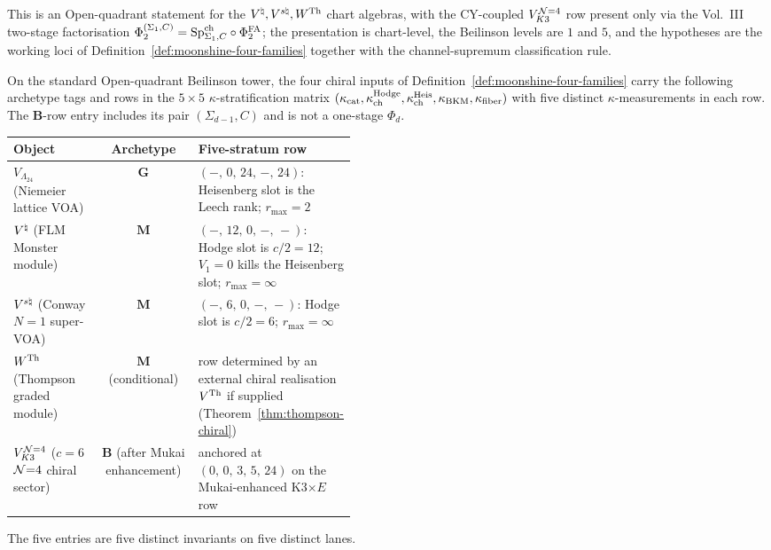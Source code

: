\begin{remark}
\label{rem:moonshine-five-stratum-archetype}
This is an Open-quadrant statement for the $V^{\natural},V^{s\natural},W^{\mathrm{Th}}$
chart algebras, with the CY-coupled $V_{K3}^{\mathcal N{=}4}$ row present only via
the Vol.~III two-stage factorisation
$\Phi_2^{(\Sigma_1,C)}=\mathrm{Sp}^{\mathrm{ch}}_{\Sigma_1,C}\circ\Phi^{\mathrm{FA}}_2$;
the presentation is chart-level, the Beilinson levels are $1$ and
$5$, and the hypotheses are the working loci of
Definition~\ref{def:moonshine-four-families} together with the
channel-supremum classification rule.

On the standard Open-quadrant Beilinson tower, the four chiral inputs
of Definition~\ref{def:moonshine-four-families} carry the following
archetype tags and rows in the
$5\times5$ $\kappa$-stratification matrix
$(\kappa_{\mathrm{cat}},\kappa^{\mathrm{Hodge}}_{\mathrm{ch}},
\kappa^{\mathrm{Heis}}_{\mathrm{ch}},\kappa_{\mathrm{BKM}},\kappa_{\mathrm{fiber}})$
with five distinct $\kappa$-measurements in each row. The
$\mathbf B$-row entry includes its pair $(\Sigma_{d-1},C)$ and is
not a one-stage $\Phi_d$.
\begin{center}
\renewcommand{\arraystretch}{1.3}
\begin{tabular}{l|c|p{0.45\linewidth}}
\toprule
\textbf{Object} & \textbf{Archetype} & \textbf{Five-stratum row} \\
\midrule
$V_{\Lambda_{24}}$ (Niemeier lattice VOA) & $\mathbf G$ &
 $(-,\,0,\,24,\,-,\,24)$: Heisenberg slot is the Leech rank;
 $r_{\max}=2$ \\
$V^{\natural}$ (FLM Monster module) & $\mathbf M$ &
 $(-,\,12,\,0,\,-,\,-)$: Hodge slot is $c/2{=}12$;
 $V_1{=}0$ kills the Heisenberg slot;
 $r_{\max}=\infty$ \\
$V^{s\natural}$ (Conway $N{=}1$ super-VOA) & $\mathbf M$ &
 $(-,\,6,\,0,\,-,\,-)$: Hodge slot is $c/2{=}6$;
 $r_{\max}=\infty$ \\
$W^{\mathrm{Th}}$ (Thompson graded module) & $\mathbf M$ (conditional) &
 row determined by an external chiral realisation $V^{\mathrm{Th}}$ if supplied
 (Theorem~\ref{thm:thompson-chiral}) \\
$V_{K3}^{\mathcal N{=}4}$ ($c{=}6$ $\mathcal N{=}4$ chiral sector) & $\mathbf B$
 (after Mukai enhancement) &
 anchored at $(0,\,0,\,3,\,5,\,24)$ on the
 Mukai-enhanced K3$\times E$ row \\
\bottomrule
\end{tabular}
\end{center}
The five entries are five distinct invariants on five distinct lanes.

\end{remark}
